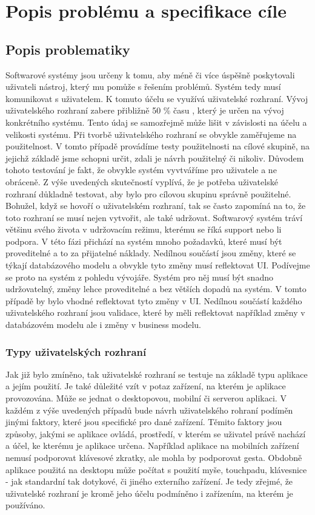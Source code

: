\chapter{Popis problému a specifikace cíle}
\section{Popis problematiky}
Softwarové systémy jsou určeny k tomu, aby méně či více úspěšně poskytovali uživateli nástroj, který mu pomůže s řešením problémů. Systém tedy musí komunikovat s uživatelem. K tomuto účelu se využívá uživatelské rozhraní. Vývoj uživatelského rozhraní zabere přibližně 50 \% času \cite{cernyTSUID}, který je určen na vývoj konkrétního systému. Tento údaj se samozřejmě může lišit v závislosti na účelu a velikosti systému. Při tvorbě uživatelského rozhraní se obvykle zaměřujeme na použitelnost. V tomto případě provádíme testy použitelnosti na cílové skupině, na jejichž základě jsme schopni určit, zdali je návrh použitelný či nikoliv. Důvodem tohoto testování je fakt, že obvykle systém vyvtváříme pro uživatele a ne obráceně. Z výše uvedených skutečností vyplívá, že je potřeba uživatelské rozhraní důkladně testovat, aby bylo pro cílovou skupinu správně použitelné. Bohužel, když se hovoří o uživatelském rozhraní, tak se často zapomíná na to, že toto rozhraní se musí nejen vytvořit, ale také udržovat. Softwarový systém tráví většinu svého života v udržovacím režimu, kterému se říká support nebo li podpora. V této fázi přichází na systém mnoho požadavků, které musí být proveditelné a to za přijatelné náklady. Nedílnou součástí jsou změny, které se týkají databázového modelu a obvykle tyto změny musí reflektovat UI. Podívejme se proto na systém z pohledu vývojáře. Systém pro něj musí být snadno udržovatelný, změny lehce proveditelné a bez větších dopadů na systém. V tomto případě by bylo vhodné reflektovat tyto změny v UI. Nedílnou součástí každého uživatelského rozhraní jsou validace, které by měli reflektovat například změny v databázovém modelu ale i změny v business modelu.
\subsection{Typy uživatelských rozhraní}
Jak již bylo zmíněno, tak uživatelské rozhraní se testuje na základě typu aplikace a jejím použití. Je také důležité vzít v potaz zařízení, na kterém je aplikace provozována. Může se jednat o desktopovou, mobilní či serverou aplikaci. V každém z výše uvedených případů bude návrh uživatelského rohraní podíměn jinými faktory, které jsou specifické pro dané zařízení. Těmito faktory jsou způsoby, jakými se aplikace ovládá, prostředí, v kterém se uživatel právě nachází a účel, ke kterému je aplikace určena. Například aplikace na mobilních zařízení nemusí podporovat klávesové zkratky, ale mohla by podporovat gesta. Obdobně aplikace použitá na desktopu může počítat s použití myše, touchpadu, klávesnice - jak standardní tak dotykové, či jiného externího zařízení. Je tedy zřejmé, že uživatelské rozhraní je kromě jeho účelu podmíněno i zařízením, na kterém je používáno.

